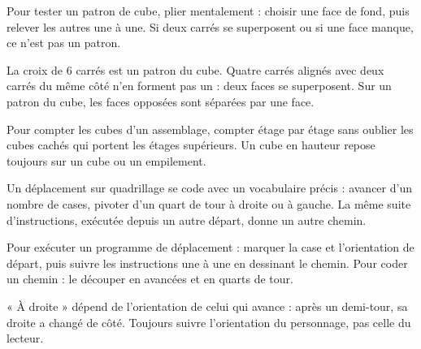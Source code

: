 \begin{savoirfaire}Pour tester un patron de cube, plier mentalement : choisir une face de fond, puis relever les autres une à une. Si deux carrés se superposent ou si une face manque, ce n’est pas un patron.\end{savoirfaire}
\begin{exemple}La croix de 6 carrés est un patron du cube. Quatre carrés alignés avec deux carrés du même côté n’en forment pas un : deux faces se superposent. Sur un patron du cube, les faces opposées sont séparées par une face.\end{exemple}
\clearpage
{}\label{cours-18-4}
\begin{savoirfaire}Pour compter les cubes d’un assemblage, compter étage par étage sans oublier les cubes cachés qui portent les étages supérieurs. Un cube en hauteur repose toujours sur un cube ou un empilement.\end{savoirfaire}
\begin{exemple}Un déplacement sur quadrillage se code avec un vocabulaire précis : avancer d’un nombre de cases, pivoter d’un quart de tour à droite ou à gauche. La même suite d’instructions, exécutée depuis un autre départ, donne un autre chemin.\end{exemple}
\begin{savoirfaire}Pour exécuter un programme de déplacement : marquer la case et l’orientation de départ, puis suivre les instructions une à une en dessinant le chemin. Pour coder un chemin : le découper en avancées et en quarts de tour.\end{savoirfaire}
\begin{attention}« À droite » dépend de l’orientation de celui qui avance : après un demi-tour, sa droite a changé de côté. Toujours suivre l’orientation du personnage, pas celle du lecteur.\end{attention}

